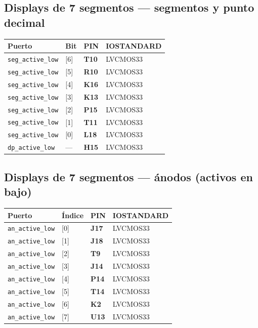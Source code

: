 \documentclass[a4paper,12pt]{article}
\begin{document}
\subsection*{Displays de 7 segmentos — segmentos y punto decimal}
\begin{tabular}{@{}llll@{}}
\toprule
\textbf{Puerto} & \textbf{Bit} & \textbf{PIN} & \textbf{IOSTANDARD} \\
\midrule
\texttt{seg\_active\_low} & [6] & \textbf{T10} & LVCMOS33 \\
\texttt{seg\_active\_low} & [5] & \textbf{R10} & LVCMOS33 \\
\texttt{seg\_active\_low} & [4] & \textbf{K16} & LVCMOS33 \\
\texttt{seg\_active\_low} & [3] & \textbf{K13} & LVCMOS33 \\
\texttt{seg\_active\_low} & [2] & \textbf{P15} & LVCMOS33 \\
\texttt{seg\_active\_low} & [1] & \textbf{T11} & LVCMOS33 \\
\texttt{seg\_active\_low} & [0] & \textbf{L18} & LVCMOS33 \\
\midrule
\texttt{dp\_active\_low} & — & \textbf{H15} & LVCMOS33 \\
\bottomrule
\end{tabular}

\subsection*{Displays de 7 segmentos — ánodos (activos en bajo)}
\begin{tabular}{@{}llll@{}}
\toprule
\textbf{Puerto} & \textbf{Índice} & \textbf{PIN} & \textbf{IOSTANDARD} \\
\midrule
\texttt{an\_active\_low} & [0] & \textbf{J17} & LVCMOS33 \\
\texttt{an\_active\_low} & [1] & \textbf{J18} & LVCMOS33 \\
\texttt{an\_active\_low} & [2] & \textbf{T9}  & LVCMOS33 \\
\texttt{an\_active\_low} & [3] & \textbf{J14} & LVCMOS33 \\
\texttt{an\_active\_low} & [4] & \textbf{P14} & LVCMOS33 \\
\texttt{an\_active\_low} & [5] & \textbf{T14} & LVCMOS33 \\
\texttt{an\_active\_low} & [6] & \textbf{K2}  & LVCMOS33 \\
\texttt{an\_active\_low} & [7] & \textbf{U13} & LVCMOS33 \\
\bottomrule
\end{tabular}
\end{document}
